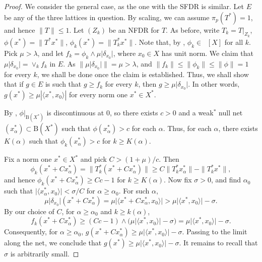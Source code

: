\documentclass{amsart}
\theoremstyle{plain}
\theoremstyle{definition}
\numberwithin{equation}{section}
\newcommand{\ball}{\mathrm{B}}
\DeclareMathOperator{\FBLp}{FBL^{\mathit{(p)}}}
\begin{document}
\begin{proof}
We consider the general case, as the one with the SFDR is similar.
Let $E$ be any of the three lattices in question. By scaling, we can assume $\pi_p(T^*) = 1$, and hence $\|T\| \leq 1$. Let $(Z_k)$ be an NFDR for $T$.
As before, write $T_k = T \big|_{Z_k}$, $\phi(x^*) = \|T^* x^*\|$, $\phi_k(x^*) = \|T_k^* x^*\|$. Note that, by , $\phi_k \in \FBLp[X]$ for all $k$.
Pick $\mu > \lambda$, and let $f_k = \phi_k \wedge \mu \big|\delta_{x_0}\big|$, where $x_0 \in X$ has unit norm.
We claim that $\mu \big|\delta_{x_0}\big| = \vee_k f_k$ in $E$. As $\|\mu \big|\delta_{x_0}\big|\| = \mu > \lambda$, and $\|f_k\| \leq \|\phi_k\| \leq \|\phi\| = 1$ for every $k$, we shall be done once the claim is established. Thus, we shall show that if $g \in E$ is such that $g \geq f_k$ for every $k$, then $g \geq \mu \big|\delta_{x_0}\big|$.
In other words, $g(x^*) \geq \mu |\langle x^*, x_0 \rangle|$ for every norm one $x^* \in X^*$.

By , $\phi|_{\ball(X^*)}$ is discontinuous at $0$, so there exists $c > 0$ and a weak$^*$ null net $(x_\alpha^*) \subset \ball(X^*)$ such that $\phi(x_\alpha^*) > c$ for each $\alpha$. Thus, for each $\alpha$, there exists $K(\alpha)$ such that $\phi_k(x_\alpha^*) > c$ for $k \geq K(\alpha)$.

Fix a norm one $x^* \in X^*$ and pick $C > (1 + \mu)/c$. Then
$$
\phi_k(x^* + C x_\alpha^*) = \|T_k^*(x^* + C x_\alpha^*)\| \geq C \|T_k^* x_\alpha^*\| - \|T_k^* x^*\| ,
$$
and hence $\phi_k(x^* + C x_\alpha^*) \geq Cc-1$ for $k \geq K(\alpha)$. Now fix $\sigma > 0$, and find $\alpha_0$ such that $\big| \langle x_\alpha^* , x_0 \rangle \big| < \sigma/C$ for $\alpha \geq \alpha_0$. For such $\alpha$,
$$
\mu \big| \delta_{x_0} \big| (x^* + C x_\alpha^*) = \mu \big| \langle x^* + C x_\alpha^* , x_0 \rangle \big| > \mu \big| \langle x^* , x_0 \rangle \big| - \sigma .
$$
By our choice of $C$, for $\alpha \geq \alpha_0$ and $k \geq k(\alpha)$,
$$
f_k (x^* + C x_\alpha^*) \geq (Cc - 1) \wedge \big( \mu \big| \langle x^* , x_0 \rangle \big| - \sigma \big) = \mu \big| \langle x^* , x_0 \rangle \big| - \sigma .
$$
Consequently, for $\alpha \geq \alpha_0$, $g (x^* + C x_\alpha^*) \geq \mu \big| \langle x^* , x_0 \rangle \big| - \sigma$. Passing to the limit along the net, we conclude that $g (x^*) \geq \mu \big| \langle x^* , x_0 \rangle \big| - \sigma$. It remains to recall that $\sigma$ is arbitrarily small.
\end{proof}
\end{document}
